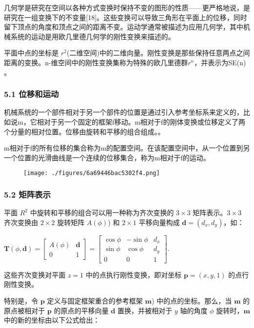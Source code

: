 几何学是研究在空间以各种方式变换时保持不变的图形的性质——更严格地说，是研究在一组变换下的不变量[18]。这些变换可以导致三角形在平面上的位移，同时留下顶点的角度和顶点之间的距离不变。运动学通常被描述为应用几何学，其中机械系统的运动是用欧几里德几何学的刚性变换来描述的。

平面中点的坐标是 $r^2$(二维空间)中的二维向量。刚性变换是那些保持任意两点之间距离的变换。n-维空间中的刚性变换集称为特殊的欧几里德群$r^n$，并表示为SE(n) 。

\subsubsection{5.1 位移和运动}

机械系统的一个部件相对于另一个部件的位置是通过引入参考坐标系来定义的，比如说m，它相对于另一个固定的框架f移动。m相对于f的刚体变换或位移定义了两个分量的相对位置。位移由旋转和平移的组合组成。。

m相对于f的所有位移的集合称为m的配置空间。在该配置空间中，从一个位置到另一个位置的光滑曲线是一个连续的位移集合，称为m相对于f的运动。

\begin{figure}[ht]
\centering
\texttt{[image: ./figures/6a69446bac5302f4.png]}
\caption \label{fig_YDX_2}
\end{figure}

\subsubsection{5.2 矩阵表示}

平面 $R^2$ 中旋转和平移的组合可以用一种称为齐次变换的 $3 \times 3 $ 矩阵表示。$ 3 \times 3 $ 齐次变换由 $ 2 \times 2 $ 旋转矩阵 $ A(\phi) $) 和 $2 \times 1 $ 平移向量构成 $\mathbf{d} = (d_x, d_y)$，如：

$\mathbf{T}(\phi, \mathbf{d}) = \begin{bmatrix}A(\phi) & \mathbf{d} \\0 & 1 \end{bmatrix} = \begin{bmatrix}\cos \phi & -\sin \phi & d_x \\\sin \phi & \cos \phi & d_y \\0 & 0 & 1\end{bmatrix}$.

这些齐次变换对平面 $ z=1 $ 中的点执行刚性变换，即对坐标 $\mathbf{p} = (x, y, 1) $ 的点行刚性变换。

特别是，令 $\mathbf{p}$ 定义与固定框架重合的参考框架 $\mathbf{m}$) 中的点的坐标。那么，当 $\mathbf{m}$ 的原点被相对于 $\mathbf{p}$ 的原点的平移向量 $\mathbf{d} $ 置换，并被相对于 $ y $ 轴的角度 $\phi$ 旋转时，$\mathbf{m}$ 中的新的坐标由以下公式给出：

